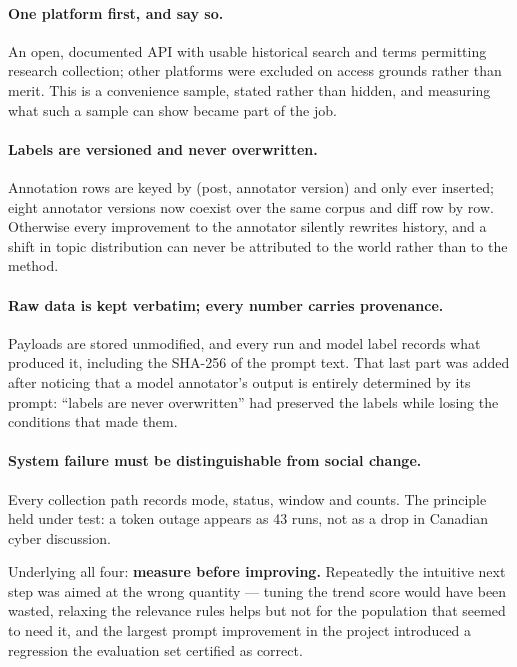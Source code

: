 \documentclass[11pt]{article}
\begin{document}
\paragraph{One platform first, and say so.}
An open, documented API with usable historical search and terms permitting
research collection; other platforms were excluded on access grounds rather
than merit. This is a convenience sample, stated rather than hidden, and
measuring what such a sample can show became part of the job.

\paragraph{Labels are versioned and never overwritten.}
Annotation rows are keyed by (post, annotator version) and only ever inserted;
eight annotator versions now coexist over the same corpus and diff row by row.
Otherwise every improvement to the annotator silently rewrites history, and a
shift in topic distribution can never be attributed to the world rather than to
the method.

\paragraph{Raw data is kept verbatim; every number carries provenance.}
Payloads are stored unmodified, and every run and model label records what
produced it, including the SHA-256 of the prompt text. That last part was added
after noticing that a model annotator's output is entirely determined by its
prompt: ``labels are never overwritten'' had preserved the labels while losing
the conditions that made them.

\paragraph{System failure must be distinguishable from social change.}
Every collection path records mode, status, window and counts. The principle
held under test: a token outage appears as 43  runs, not as a
drop in Canadian cyber discussion.

\begin{keybox}
Underlying all four: \textbf{measure before improving.} Repeatedly the
intuitive next step was aimed at the wrong quantity --- tuning the trend score
would have been wasted, relaxing the relevance rules helps but not for the
population that seemed to need it, and the largest prompt improvement in the
project introduced a regression the evaluation set certified as correct.
\end{keybox}
\end{document}
